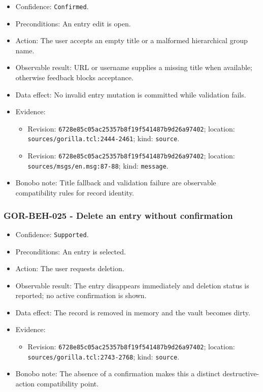 \documentclass[
  letterpaper,
]{article}
\newcommand{\passthrough}[1]{#1}
\providecommand{\tightlist}{%
  \setlength{\itemsep}{0pt}\setlength{\parskip}{0pt}}
\begin{document}
\begin{itemize}
\tightlist
\item
  Confidence: \passthrough{\lstinline!Confirmed!}.
\item
  Preconditions: An entry edit is open.
\item
  Action: The user accepts an empty title or a malformed hierarchical group name.
\item
  Observable result: URL or username supplies a missing title when available; otherwise feedback blocks acceptance.
\item
  Data effect: No invalid entry mutation is committed while validation fails.
\item
  Evidence:

  \begin{itemize}
  \tightlist
  \item
    Revision: \nolinkurl{6728e85c05ac25357b8f19f541487b9d26a97402}; location: \nolinkurl{sources/gorilla.tcl:2444-2461};
    kind: \passthrough{\lstinline!source!}.
  \item
    Revision: \nolinkurl{6728e85c05ac25357b8f19f541487b9d26a97402}; location: \nolinkurl{sources/msgs/en.msg:87-88};
    kind: \passthrough{\lstinline!message!}.
  \end{itemize}
\item
  Bonobo note: Title fallback and validation failure are observable compatibility rules for record identity.
\end{itemize}

\subsubsection{GOR-BEH-025 - Delete an entry without
confirmation}\label{gor-beh-025---delete-an-entry-without-confirmation}

\begin{itemize}
\tightlist
\item
  Confidence: \passthrough{\lstinline!Supported!}.
\item
  Preconditions: An entry is selected.
\item
  Action: The user requests deletion.
\item
  Observable result: The entry disappears immediately and deletion status is reported; no active confirmation is shown.
\item
  Data effect: The record is removed in memory and the vault becomes dirty.
\item
  Evidence:

  \begin{itemize}
  \tightlist
  \item
    Revision: \nolinkurl{6728e85c05ac25357b8f19f541487b9d26a97402}; location: \nolinkurl{sources/gorilla.tcl:2743-2768};
    kind: \passthrough{\lstinline!source!}.
  \end{itemize}
\item
  Bonobo note: The absence of a confirmation makes this a distinct destructive-action compatibility point.
\end{itemize}
\end{document}
